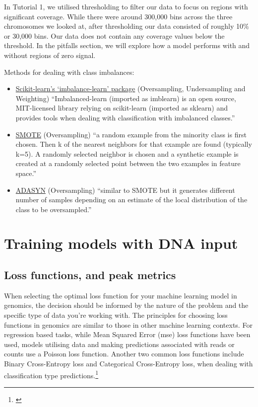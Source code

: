 \documentclass[
]{book}
\begin{document}
In Tutorial 1, we utilised thresholding to filter our data to focus on regions with significant coverage. While there were around 300,000 bins across the three chromosomes we looked at, after thresholding our data consisted of roughly 10\% or 30,000 bins. Our data does not contain any coverage values below the threshold. In the pitfalls section, we will explore how a model performs with and without regions of zero signal.

Methods for dealing with class imbalances:

\begin{itemize}
\item
  \href{https://imbalanced-learn.org/stable/user_guide.html\#user-guide}{Scikit-learn's `imbalance-learn' package} (Oversampling, Undersampling and Weighting)
  ``Imbalanced-learn (imported as imblearn) is an open source, MIT-licensed library relying on scikit-learn (imported as sklearn) and provides tools when dealing with classification with imbalanced classes.''
\item
  \href{https://machinelearningmastery.com/smote-oversampling-for-imbalanced-classification/}{SMOTE} (Oversampling)
  ``a random example from the minority class is first chosen. Then k of the nearest neighbors for that example are found (typically k=5). A randomly selected neighbor is chosen and a synthetic example is created at a randomly selected point between the two examples in feature space.''
\item
  \href{https://imbalanced-learn.org/stable/references/generated/imblearn.over_sampling.ADASYN.html}{ADASYN} (Oversampling)
  ``similar to SMOTE but it generates different number of samples depending on an estimate of the local distribution of the class to be oversampled.''
\end{itemize}

\part{Training models with DNA input}\label{part-training-models-with-dna-input}

\chapter{Loss functions, and peak metrics}\label{loss-functions-and-peak-metrics}

When selecting the optimal loss function for your machine learning model in genomics, the decision should be informed by the nature of the problem and the specific type of data you're working with. The principles for choosing loss functions in genomics are similar to those in other machine learning contexts. For regression based tasks, while Mean Squared Error (mse) loss functions have been used, models utilising data and making predictions associated with reads or counts use a Poisson loss function. Another two common loss functions include Binary Cross-Entropy loss and Categorical Cross-Entropy loss, when dealing with classification type predictions.\footnote{\citet{patterson2017}}
\end{document}
